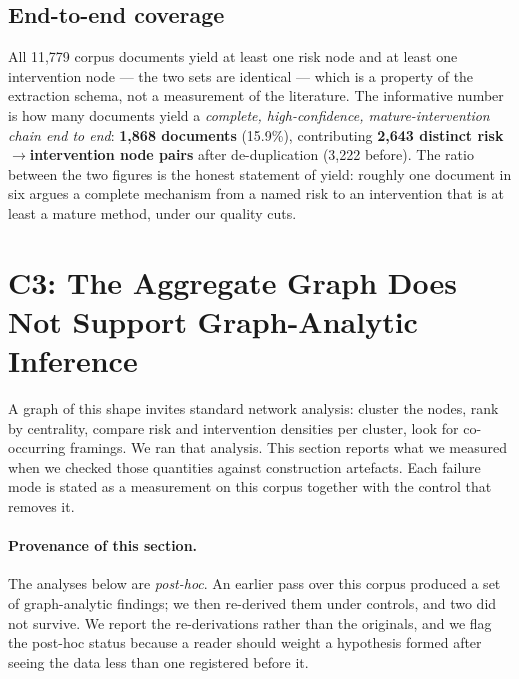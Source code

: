 \documentclass[10pt,twocolumn,letterpaper]{article}
\begin{document}
\subsection{End-to-end coverage}

All 11{,}779 corpus documents yield at least one risk node and at least one
intervention node --- the two sets are identical --- which is a property of the
extraction schema, not a measurement of the literature. The informative number is
how many documents yield a \emph{complete, high-confidence, mature-intervention
chain end to end}: \textbf{1{,}868 documents} (15.9\%), contributing
\textbf{2{,}643 distinct risk$\rightarrow$intervention node pairs} after
de-duplication (3{,}222 before).
The ratio between the two figures is the honest statement of yield: roughly one
document in six argues a complete mechanism from a named risk to an intervention
that is at least a mature method, under our quality cuts.

\section{C3: The Aggregate Graph Does Not Support Graph-Analytic Inference}
\label{sec:claim3}

A graph of this shape invites standard network analysis: cluster the nodes, rank
by centrality, compare risk and intervention densities per cluster, look for
co-occurring framings. We ran that analysis. This section reports what we
measured when we checked those quantities against construction artefacts. Each
failure mode is stated as a measurement on this corpus together with the control
that removes it.

\paragraph{Provenance of this section.} The analyses below are \emph{post-hoc}.
An earlier pass over this corpus produced a set of graph-analytic findings; we
then re-derived them under controls, and two did not survive. We report the
re-derivations rather than the originals, and we flag the post-hoc status because
a reader should weight a hypothesis formed after seeing the data less than one
registered before it.
\end{document}
